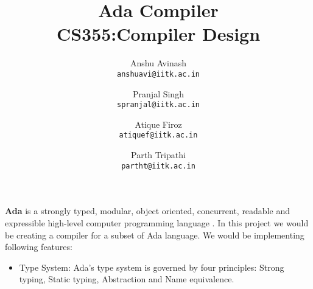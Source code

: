 \documentclass{article}
\title{
Ada Compiler \\
CS355:Compiler Design
}
\author{
Anshu Avinash\\
\texttt{anshuavi@iitk.ac.in}
\and
Pranjal Singh\\
\texttt{spranjal@iitk.ac.in}
\and
Atique Firoz\\
\texttt{atiquef@iitk.ac.in}
\and
Parth Tripathi\\
\texttt{partht@iitk.ac.in}
}
\begin{document}
\maketitle
\textbf{Ada} is a strongly typed, modular, object oriented, concurrent, readable and expressible high-level computer programming language \cite{AdaIC}. In this project we would be creating a compiler for a subset of Ada language. We would be implementing following features:
\begin{itemize}
	\item Type System: Ada's type system is governed by four principles: Strong typing, Static typing, Abstraction and Name equivalence.
\end{itemize}
\printbibliography
\end{document}
